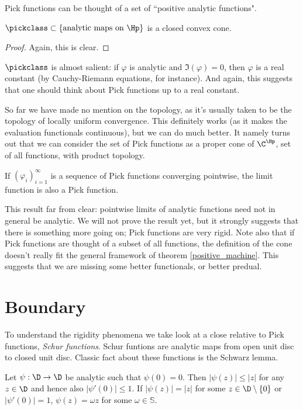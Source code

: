 Pick functions can be thought of a set of ``positive analytic functions".

\begin{lause}
	$\pickclass \subset \{\text{analytic maps on $\Hp$} \}$ is a closed convex cone.
\end{lause}
\begin{proof}
	Again, this is clear.
\end{proof}

$\pickclass$ is almost salient: if $\varphi$ is analytic and $\Im(\varphi) = 0$, then $\varphi$ is a real constant (by Cauchy-Riemann equations, for instance). And again, this suggests that one should think about Pick functions up to a real constant.

So far we have made no mention on the topology, as it's usually taken to be the topology of locally uniform convergence. This definitely works (as it makes the evaluation functionals continuous), but we can do much better. It namely turns out that we can consider the set of Pick functions as a proper cone of $\C^{\Hp}$, set of all functions, with product topology.

\begin{prop}\label{pick_convergence}
	If $(\varphi_{i})_{i = 1}^{\infty}$ is a sequence of Pick functions converging pointwise, the limit function is also a Pick function.
\end{prop}

This result far from clear: pointwise limits of analytic functions need not in general be analytic. We will not prove the result yet, but it strongly suggests that there is something more going on; Pick functions are very rigid. Note also that if Pick functions are thought of a subset of all functions, the definition of the cone doesn't really fit the general framework of theorem \ref{positive_machine}. This suggests that we are missing some better functionals, or better predual.

\section{Boundary}

To understand the rigidity phenomena we take look at a close relative to Pick functions, \textit{Schur functions}. Schur funtions are analytic maps from open unit disc to closed unit disc. Classic fact about these functions is the Schwarz lemma.

\begin{lause}
	Let $\psi : \D \to \D$ be analytic such that $\psi(0) = 0$. Then $|\psi(z)| \leq |z|$ for any $z \in \D$ and hence also $|\psi'(0)| \leq 1$. If $|\psi(z)| = |z|$ for some $z \in \D \setminus \{0\}$ or $|\psi'(0)| = 1$, $\psi(z) = \omega z$ for some $\omega \in \mathbb{S}$.
\end{lause}

